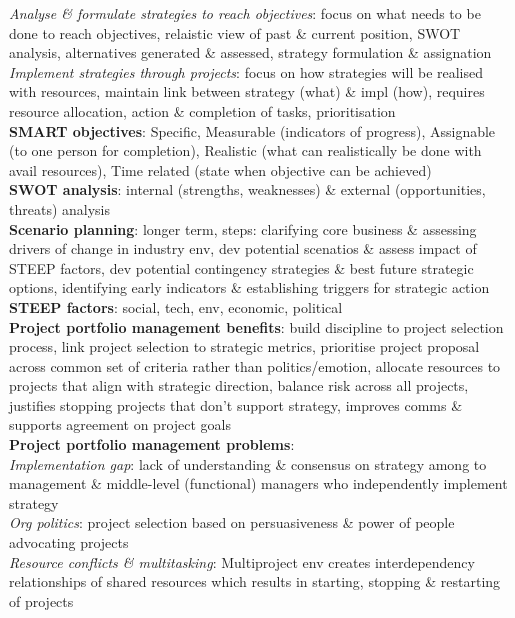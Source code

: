 \documentclass[a4paper]{article}
\begin{document}
\begin{multicols}{3}
        \textit{Analyse \& formulate strategies to reach objectives}: focus on what needs to be done to reach objectives, relaistic view of past \& current position, SWOT analysis, alternatives generated \& assessed, strategy formulation \& assignation\\
        \textit{Implement strategies through projects}: focus on how strategies will be realised with resources, maintain link between strategy (what) \& impl (how), requires resource allocation, action \& completion of tasks, prioritisation\\
        \textbf{SMART objectives}: Specific, Measurable (indicators of progress), Assignable (to one person for completion), Realistic (what can realistically be done with avail resources), Time related (state when objective can be achieved)\\
        \textbf{SWOT analysis}: internal (strengths, weaknesses) \& external (opportunities, threats) analysis\\
        \textbf{Scenario planning}: longer term, steps: clarifying core business \& assessing drivers of change in industry env, dev potential scenatios \& assess impact of STEEP factors, dev potential contingency strategies \& best future strategic options, identifying early indicators \& establishing triggers for strategic action\\
        \textbf{STEEP factors}: social, tech, env, economic, political\\
        \textbf{Project portfolio management benefits}: build discipline to project selection process, link project selection to strategic metrics, prioritise project proposal across common set of criteria rather than politics/emotion, allocate resources to projects that align with strategic direction, balance risk across all projects, justifies stopping projects that don't support strategy, improves comms \& supports agreement on project goals\\
        \textbf{Project portfolio management problems}:\\
        \textit{Implementation gap}: lack of understanding \& consensus on strategy among to management \& middle-level (functional) managers who independently implement strategy\\
        \textit{Org politics}: project selection based on persuasiveness \& power of people advocating projects\\
        \textit{Resource conflicts \& multitasking}: Multiproject env creates interdependency relationships of shared resources which results in starting, stopping \& restarting of projects\\

\end{multicols}
\end{document}
